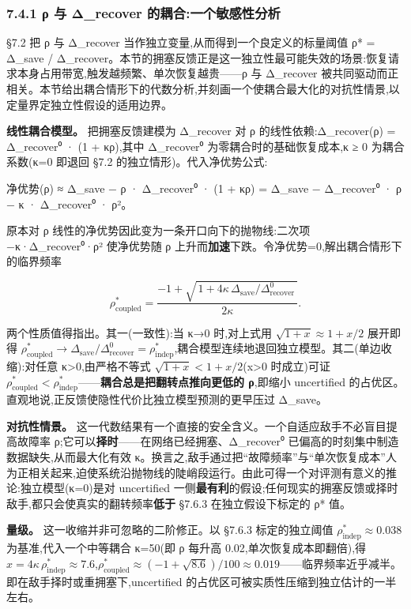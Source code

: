 \documentclass[UTF8,fontset=windows,a4paper,11pt]{ctexart}
\begin{document}
\subsubsection{7.4.1 ρ 与 Δ\_recover
的耦合:一个敏感性分析}\label{sec:coupling-sensitivity}

§7.2 把 ρ 与 Δ\_recover
当作独立变量,从而得到一个良定义的标量阈值 ρ* = Δ\_save /
Δ\_recover。本节的拥塞反馈正是这一独立性最可能失效的场景:恢复请求本身占用带宽,触发越频繁、单次恢复越贵------ρ 与 Δ\_recover
被共同驱动而正相关。本节给出耦合情形下的代数分析,并刻画一个使耦合最大化的对抗性情景,以定量界定独立性假设的适用边界。

\textbf{线性耦合模型。}
把拥塞反馈建模为 Δ\_recover 对 ρ 的线性依赖:Δ\_recover(ρ) =
Δ\_recover⁰ · (1 + κρ),其中 Δ\_recover⁰ 为零耦合时的基础恢复成本,κ ≥ 0
为耦合系数(κ=0 即退回 §7.2 的独立情形)。代入净优势公式:

净优势(ρ) ≈ Δ\_save − ρ · Δ\_recover⁰ · (1 + κρ) = Δ\_save −
Δ\_recover⁰ · ρ − κ · Δ\_recover⁰ · ρ²。

原本对 ρ 线性的净优势因此变为一条开口向下的抛物线:二次项 −κ·Δ\_recover⁰·ρ²
使净优势随 ρ 上升而\textbf{加速}下跌。令净优势=0,解出耦合情形下的临界频率

$$\rho^{*}_{\mathrm{coupled}} = \frac{-1 + \sqrt{\,1 + 4\kappa\,\Delta_{\mathrm{save}}/\Delta_{\mathrm{recover}}^{0}\,}}{2\kappa}.$$

两个性质值得指出。其一(一致性):当 κ→0 时,对上式用
$\sqrt{1+x}\approx 1 + x/2$ 展开即得 $\rho^{*}_{\mathrm{coupled}} \to
\Delta_{\mathrm{save}}/\Delta_{\mathrm{recover}}^{0} =
\rho^{*}_{\mathrm{indep}}$,耦合模型连续地退回独立模型。其二(单边收缩):对任意
κ\textgreater0,由严格不等式 $\sqrt{1+x} < 1 + x/2$(x\textgreater0
时成立)可证 $\rho^{*}_{\mathrm{coupled}} <
\rho^{*}_{\mathrm{indep}}$------\textbf{耦合总是把翻转点推向更低的
ρ},即缩小 uncertified
的占优区。直观地说,正反馈使隐性代价比独立模型预测的更早压过 Δ\_save。

\textbf{对抗性情景。}
这一代数结果有一个直接的安全含义。一个自适应敌手不必盲目提高故障率
ρ;它可以\textbf{择时}------在网络已经拥塞、Δ\_recover⁰
已偏高的时刻集中制造数据缺失,从而最大化有效
κ。换言之,敌手通过把``故障频率''与``单次恢复成本''人为正相关起来,迫使系统沿抛物线的陡峭段运行。由此可得一个对评测有意义的推论:独立模型(κ=0)是对
uncertified 一侧\textbf{最有利}的假设;任何现实的拥塞反馈或择时敌手,都只会使真实的翻转频率\textbf{低于}
§7.6.3 在独立假设下标定的 ρ* 值。

\textbf{量级。} 这一收缩并非可忽略的二阶修正。以 §7.6.3 标定的独立阈值
$\rho^{*}_{\mathrm{indep}} \approx 0.038$ 为基准,代入一个中等耦合
κ=50(即 ρ 每升高 0.02,单次恢复成本即翻倍),得 $x =
4\kappa\,\rho^{*}_{\mathrm{indep}} \approx 7.6$,$\rho^{*}_{\mathrm{coupled}}
\approx (-1+\sqrt{8.6})/100 \approx 0.019$------临界频率近乎减半。即在敌手择时或重拥塞下,uncertified
的占优区可被实质性压缩到独立估计的一半左右。
\end{document}
